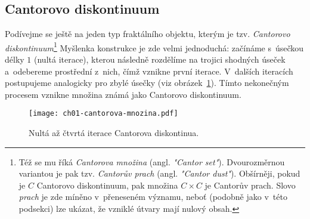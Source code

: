 \subsection{Cantorovo diskontinuum}\label{subsec:cantorovo_diskontinuum}
Podívejme se ještě na jeden typ fraktálního objektu, kterým je tzv. \emph{Cantorovo diskontinuum}\footnote{Též se mu říká \emph{Cantorova množina} (angl. \emph{"Cantor set"}). Dvourozměrnou variantou je pak tzv. \emph{Cantorův prach} (angl. \emph{"Cantor dust"}). Obšírněji, pokud je $C$ Cantorovo diskontinuum, pak množina $C\times C$ je Cantorův prach. Slovo \emph{prach} je zde míněno v~přeneseném významu, neboť (podobně jako v~této podsekci) lze ukázat, že vzniklé útvary mají nulový obsah.} Myšlenka konstrukce je zde velmi jednoduchá: začínáme s~úsečkou délky $1$ (nultá iterace), kterou následně rozdělíme na trojici shodných úseček a~odebereme prostřední z~nich, čímž vznikne první iterace. V~dalších iteracích postupujeme analogicky pro zbylé úsečky (viz obrázek~\ref{fig:cantorovo_diskontinuum}). Tímto nekonečným procesem vznikne množina známá jako Cantorovo diskontinuum.
\begin{figure}[h]
    \centering
    \texttt{[image: ch01-cantorova-mnozina.pdf]}
    \caption{Nultá až čtvrtá iterace Cantorova diskontinua.}
    \label{fig:cantorovo_diskontinuum}
\end{figure}

